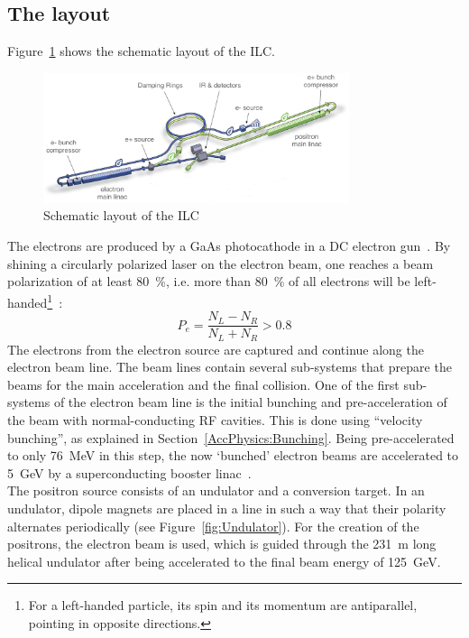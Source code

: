 \subsection{The layout}
\label{ILC:layout:details}
Figure~\ref{fig:ILC_Layout} shows the schematic layout of the ILC.
\begin{figure}
\centering
\includegraphics[width=0.8\textwidth]{Figures/ILC_layout_edited.png}
\caption[Schematic layout of the ILC]{Schematic layout of the ILC~\cite[based on p. 9]{TDR1}}
\label{fig:ILC_Layout}
\end{figure}
The electrons are produced by a GaAs photocathode in a DC electron gun~\cite[p. 13]{TDR32}.
By shining a circularly polarized laser on the electron beam, one reaches a beam polarization of at least \SI{80}{\percent}, i.e. more than \SI{80}{\percent} of all electrons will be left-handed\footnote{For a left-handed particle, its spin and its momentum are antiparallel, pointing in opposite directions.}~\cite[p. 81]{TDR32}:
\begin{equation}
 P_e = \frac{N_L-N_R}{N_L+N_R} > 0.8
\end{equation}
The electrons from the electron source are captured and continue along the electron beam line.
The beam lines contain several sub-systems that prepare the beams for the main acceleration and the final collision.
One of the first sub-systems of the electron beam line is the initial bunching and pre-acceleration of the beam with normal-conducting RF cavities.
This is done using ``velocity bunching'', as explained in Section~\ref{AccPhysics:Bunching}.
Being pre-accelerated to only \SI{76}{\MeV} in this step, the now `bunched' electron beams are accelerated to \SI{5}{\GeV} by a  superconducting booster linac~\cite[p. 81f]{TDR32}.\\
The positron source consists of an undulator and a conversion target.
In an undulator, dipole magnets are placed in a line in such a way that their polarity alternates periodically (see Figure~\ref{fig:Undulator}).
For the creation of the positrons, the electron beam is used, which is guided through the \SI{231}{\meter} long helical undulator after being accelerated to the final beam energy of \SI{125}{\GeV}.

